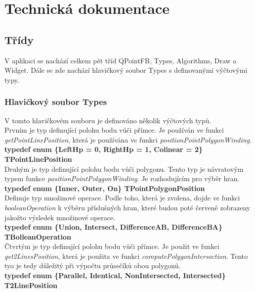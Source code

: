 \documentclass[a4paper,11pt,twoside]{article}
\begin{document}

\newpage
{}

\vspace*{-1cm}
\section{Technická dokumentace}
\subsection{Třídy}
V aplikaci se nachází celkem pět tříd QPointFB, Types, Algorithms, Draw a Widget. Dále se zde nachází hlavičkový soubor Types s definovanými výčtovými typy.

\subsubsection{Hlavičkový soubor Types}
V tomto hlavičkovém souboru je definováno několik výčtových typů. \\

\noindent Prvním je typ definující polohu bodu vůči přímce. Je používán ve funkci \textit{getPointLinePosition}, která je používána ve funkci \textit{positionPointPolygonWinding}.\\
\noindent\textbf{ typedef enum \{LeftHp = 0, RightHp = 1, Colinear = 2\} TPointLinePosition}\\

\noindent Druhým je typ definující polohu bodu vůči polygonu. Tento typ je návratovým typem funkce \textit{positionPointPolygonWinding}. Je rozhodujícím pro výběr hran.\\
\noindent\textbf{ typedef enum \{Inner, Outer, On\} TPointPolygonPosition}\\

\noindent Definuje typ množinové operace. Podle toho, která je zvolena, dojde ve funkci  \textit{booleanOperation} k výběru příslušných hran, které budou poté červeně zobrazeny jakožto výsledek množinové operace.\\
\noindent\textbf{ typedef enum \{Union, Intersect, DifferenceAB, DifferenceBA\} TBolleanOperation}\\

\noindent Čtvrtým je typ definující polohu bodu vůči přímce. Je použit ve funkci \textit{get2LinesPosition}, která je použita ve funkci \textit{computePolygonIntersection}. Tento tyo je tedy důležitý při výpočtu průsečíků obou polygonů.\\
\noindent\textbf{ typedef enum \{Parallel, Identical, NonIntersected, Intersected\} T2LinePosition}
\end{document}
